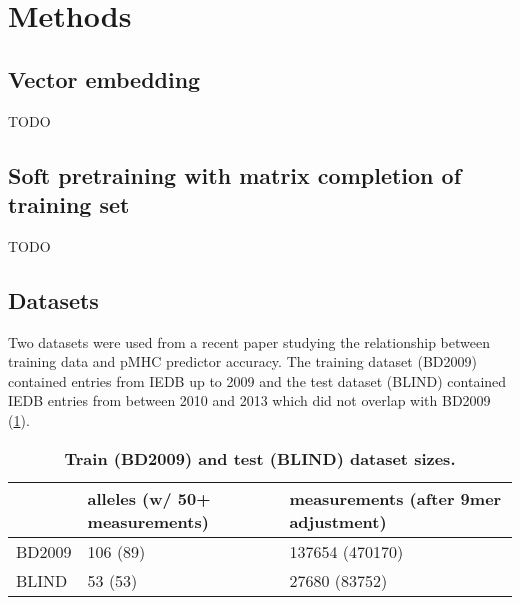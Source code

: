 \section*{Methods}
\subsection*{Vector embedding}
TODO

\subsection*{Soft pretraining with matrix completion of training set}
TODO


\subsection*{Datasets}
Two datasets were used from a recent paper studying the relationship between training data and pMHC predictor accuracy\cite{Kim_2014}. The training dataset (BD2009) contained entries from IEDB\cite{Salimi_2012} up to 2009 and the test dataset (BLIND) contained IEDB entries from between 2010 and 2013 which did not overlap with BD2009 (\ref{tab:datasets}).

\begin{table}
\label {tab:datasets}

\begin{tabular}{lll}
\toprule
{} & alleles (w/ 50+ measurements) & measurements (after 9mer adjustment) \\
\midrule
BD2009 &                      106 (89) &                      137654 (470170) \\
BLIND  &                       53 (53) &                        27680 (83752) \\
\bottomrule
\end{tabular}

\caption{\textbf{Train (BD2009) and test (BLIND) dataset sizes.}}
\end{table}
